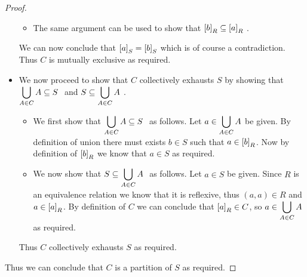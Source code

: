 \begin{proof}
\begin{itemize}
\begin{itemize}
                        \item
                            The same argument can be used to show that $\left[b\right]_{R} \subseteq \left[a\right]_{R} \ $.
                    \end{itemize}
                    We can now conclude that $\left[a\right]_{S} = \left[b\right]_{S}$ which is of course
                    a contradiction. Thus $C$ is mutually exclusive as required.
                \item
                    We now proceed to show that $C$ collectively exhausts $S$ by showing that
                    $\displaystyle\bigcup_{A \in C} A \subseteq S \ $ and $S \subseteq \displaystyle\bigcup_{A \in C} A \ $.
                    \begin{itemize}
                        \item
                            We first show that $\displaystyle\bigcup_{A \in C} A \subseteq S \ $ as follows. 
                            Let $a \in \displaystyle\bigcup_{A \in C} A$ be given. By definition of
                            union there must exists $b \in S$ such that $a \in \left[b\right]_{R}$.
                            Now by definition of $\left[b\right]_{R}$ we know that $a \in S$ as required.
                        \item
                            We now show that $S \subseteq \displaystyle\bigcup_{A \in C} A \ $ as follows. 
                            Let $a \in S$ be given. Since $R$ is an equivalence relation we know
                            that it is reflexive, thus $(a, a) \in R$ and
                            $a \in \left[a\right]_{R}$. By definition of $C$ we can conclude that
                            $\left[a\right]_{R} \in C$, so $a \in \displaystyle\bigcup_{A \in C} A$ as required.
                    \end{itemize}
                    Thus $C$ collectively exhausts $S$ as required.
            \end{itemize}
            Thus we can conclude that $C$ is a partition of $S$ as required. \QED
        \end{proof}

